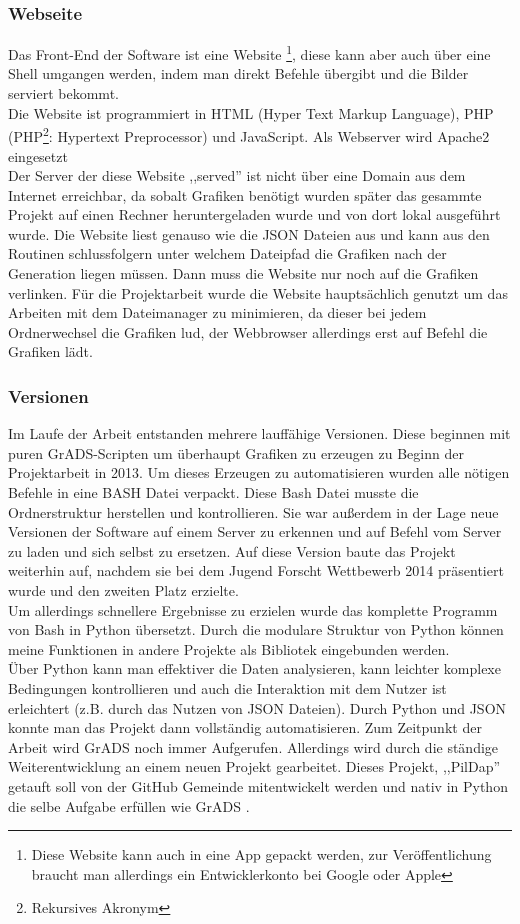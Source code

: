 \subsubsection*{Webseite}
Das Front-End der Software ist eine Website
\footnote{Diese Website kann auch in eine App gepackt werden,
zur Veröffentlichung braucht man allerdings ein Entwicklerkonto bei Google oder Apple},
diese kann aber auch über eine Shell umgangen werden, indem man \vs direkt Befehle
übergibt und die Bilder serviert bekommt.\\
Die Website ist programmiert in HTML (Hyper Text Markup Language),
PHP (PHP\footnote{Rekursives Akronym}: Hypertext Preprocessor) und JavaScript.
Als Webserver wird Apache2 eingesetzt \cite{php} \cite{apache} \\
Der Server der diese Website ,,served'' ist nicht über eine Domain aus dem Internet
erreichbar, da sobalt Grafiken benötigt wurden später das gesammte Projekt auf
einen Rechner heruntergeladen wurde und von dort lokal ausgeführt wurde.
Die Website liest genauso wie \vs die JSON Dateien aus und kann aus den
Routinen schlussfolgern unter welchem Dateipfad die Grafiken nach der Generation
liegen müssen. Dann muss die Website nur noch auf die Grafiken verlinken.
Für die Projektarbeit wurde die Website hauptsächlich genutzt um das Arbeiten mit
dem Dateimanager zu minimieren, da dieser bei jedem Ordnerwechsel die Grafiken lud,
der Webbrowser allerdings erst auf Befehl die Grafiken lädt.


\subsubsection{Versionen}
Im Laufe der Arbeit entstanden mehrere lauffähige Versionen.
Diese beginnen mit puren GrADS-Scripten um überhaupt Grafiken
zu erzeugen zu Beginn der Projektarbeit in 2013.
Um dieses Erzeugen zu automatisieren wurden alle nötigen Befehle in eine BASH Datei verpackt.
Diese Bash Datei musste die Ordnerstruktur herstellen und kontrollieren.
Sie war außerdem in der Lage neue Versionen der Software auf einem Server zu erkennen
und auf Befehl vom Server zu laden und sich selbst zu ersetzen.
Auf diese Version baute das Projekt weiterhin auf,
nachdem sie bei dem Jugend Forscht Wettbewerb 2014
präsentiert wurde und den zweiten Platz erzielte.\\
Um allerdings schnellere Ergebnisse zu erzielen wurde
das komplette Programm von Bash in Python übersetzt.
Durch die modulare Struktur von Python können meine
Funktionen in andere Projekte als Bibliotek eingebunden werden.\\
Über Python kann man effektiver die Daten analysieren,
kann leichter komplexe Bedingungen kontrollieren und
auch die Interaktion mit dem Nutzer ist erleichtert
(z.B. durch das Nutzen von JSON Dateien).
Durch Python und JSON konnte man das Projekt dann vollständig automatisieren.
Zum Zeitpunkt der Arbeit wird GrADS noch immer Aufgerufen. Allerdings
wird durch die ständige Weiterentwicklung an einem neuen Projekt gearbeitet.
Dieses Projekt, ,,PilDap'' getauft soll von der GitHub Gemeinde mitentwickelt
werden und nativ in Python die selbe Aufgabe erfüllen wie GrADS \cite{pildap}.

